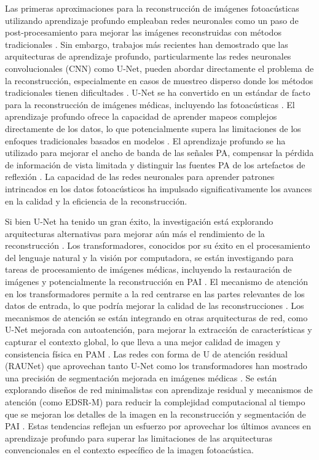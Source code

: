 Las primeras aproximaciones para la reconstrucción de imágenes fotoacústicas utilizando aprendizaje profundo empleaban redes neuronales como un paso de post-procesamiento para mejorar las imágenes reconstruidas con métodos tradicionales \cite{deep_learning_realtime_2021}. Sin embargo, trabajos más recientes han demostrado que las arquitecturas de aprendizaje profundo, particularmente las redes neuronales convolucionales (CNN) como U-Net, pueden abordar directamente el problema de la reconstrucción, especialmente en casos de muestreo disperso donde los métodos tradicionales tienen dificultades \cite{deep_learning_realtime_2021}. U-Net se ha convertido en un estándar de facto para la reconstrucción de imágenes médicas, incluyendo las fotoacústicas \cite{deep_learning_realtime_2021}. El aprendizaje profundo ofrece la capacidad de aprender mapeos complejos directamente de los datos, lo que potencialmente supera las limitaciones de los enfoques tradicionales basados en modelos \cite{resolution_enhancement_2024}. El aprendizaje profundo se ha utilizado para mejorar el ancho de banda de las señales PA, compensar la pérdida de información de vista limitada y distinguir las fuentes PA de los artefactos de reflexión \cite{pa_digital_brain_2023}. La capacidad de las redes neuronales para aprender patrones intrincados en los datos fotoacústicos ha impulsado significativamente los avances en la calidad y la eficiencia de la reconstrucción.

Si bien U-Net ha tenido un gran éxito, la investigación está explorando arquitecturas alternativas para mejorar aún más el rendimiento de la reconstrucción \cite{deep_learning_reconstruction_2024}. Los transformadores, conocidos por su éxito en el procesamiento del lenguaje natural y la visión por computadora, se están investigando para tareas de procesamiento de imágenes médicas, incluyendo la restauración de imágenes y potencialmente la reconstrucción en PAI \cite{mwg_unet_2024}. El mecanismo de atención en los transformadores permite a la red centrarse en las partes relevantes de los datos de entrada, lo que podría mejorar la calidad de las reconstrucciones \cite{improving_attention_2024}. Los mecanismos de atención se están integrando en otras arquitecturas de red, como U-Net mejorada con autoatención, para mejorar la extracción de características y capturar el contexto global, lo que lleva a una mejor calidad de imagen y consistencia física en PAM \cite{enhanced_pam_2024}. Las redes con forma de U de atención residual (RAUNet) que aprovechan tanto U-Net como los transformadores han mostrado una precisión de segmentación mejorada en imágenes médicas \cite{mwg_unet_2024}. Se están explorando diseños de red minimalistas con aprendizaje residual y mecanismos de atención (como EDSR-M) para reducir la complejidad computacional al tiempo que se mejoran los detalles de la imagen en la reconstrucción y segmentación de PAI \cite{deep_learning_reconstruction_2024}. Estas tendencias reflejan un esfuerzo por aprovechar los últimos avances en aprendizaje profundo para superar las limitaciones de las arquitecturas convencionales en el contexto específico de la imagen fotoacústica.

